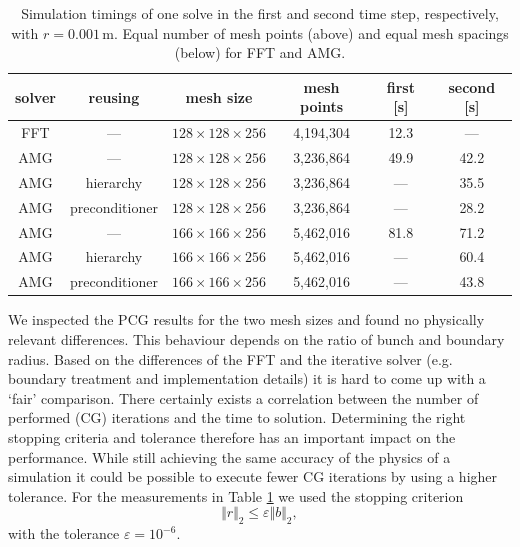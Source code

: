 \begin{table}[ht]
  \begin{center}
    \begin{tabular}{cccccc}
    \hline
        solver & reusing & mesh size & mesh points & first [s] & second [s] \\
        \hline
        FFT & --- & $128\times128\times256$ & 4,194,304 & 12.3 & --- \\
        \hline
        AMG & --- & $128\times128\times256$ & 3,236,864 & 49.9 & 42.2 \\
        AMG & hierarchy & $128\times128\times256$ & 3,236,864 & --- & 35.5 \\
        AMG & preconditioner & $128\times128\times256$ & 3,236,864 & --- & 28.2 \\
        \hline
        AMG & --- & $166\times166\times256$ & 5,462,016 & 81.8 & 71.2 \\
        AMG & hierarchy & $166\times166\times256$ & 5,462,016 & --- & 60.4 \\
        AMG & preconditioner & $166\times166\times256$ & 5,462,016 & --- & 43.8 \\
        \hline
  \end{tabular}
  \caption{Simulation timings of one solve in the first and second time
    step, respectively, with $r=0.001$\,m.  Equal number of mesh points
    (above) and equal mesh spacings (below) for FFT and AMG.}
  \label{tbl:timings_variations_overview} \end{center}
\end{table}


We inspected the PCG results for the two mesh sizes and found no
physically relevant differences. This behaviour depends on the ratio of
bunch and boundary radius.  Based on the differences of the FFT and
the iterative solver (e.g. boundary treatment and implementation details) it
is hard to come up with a `fair' comparison.  There certainly exists a
correlation between the number of performed (CG) iterations and the time
to solution.  Determining the right stopping criteria and tolerance
therefore has an important impact on the performance.  While still
achieving the same accuracy of the physics of a simulation it could be
possible to execute fewer CG iterations by using a higher tolerance.
For the measurements in Table \ref{tbl:timings_variations_overview} we
used the stopping criterion
\begin{equation*}
  \Vert r \Vert_2 \le \varepsilon  {\Vert b \Vert_2},
\end{equation*}
with the tolerance $\varepsilon = 10^{-6}$.


